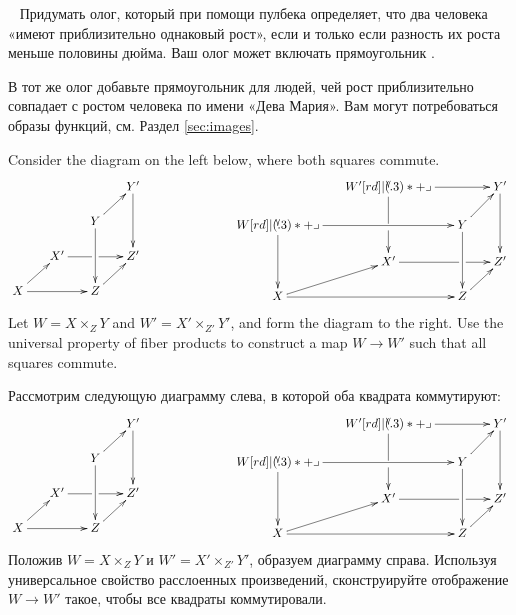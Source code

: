 \begin{exerciseRUS}~
\sexc Придумать олог, который при помощи пулбека определяет, что два человека «имеют приблизительно однаковый рост», если и только если разность их роста меньше половины дюйма. Ваш олог может включать прямоугольник . 
\item В тот же олог добавьте прямоугольник для людей, чей рост приблизительно совпадает с ростом человека по имени «Дева Мария». Вам могут потребоваться образы функций, см. Раздел \ref{sec:images}.
\endsexc
\end{exerciseRUS}

\begin{exerciseENG}\label{exc:pointwise map of fp}
Consider the diagram on the left below, where both squares commute. 
$$
\xymatrix@=15pt{
&&&Y'\ar[dd]\\
&&Y\ar[ru]\ar[dd]\\
&X'\ar'[r][rr]&&Z'\\
X\ar[rr]\ar[ru]&&Z\ar[ru]
}
\hspace{1in}
\xymatrix@=15pt{
&W'\ar[rr]\ar'[d][dd]\ullimit&&Y'\ar[dd]\\
W\ar[rr]\ar[dd]\ullimit&&Y\ar[ru]\ar[dd]\\
&X'\ar'[r][rr]&&Z'\\
X\ar[rr]\ar[ru]&&Z\ar[ru]
}
$$
Let $W=X\times_ZY$ and $W'=X'\times_{Z'}Y'$, and form the diagram to the right. Use the universal property of fiber products to construct a map $W\to W'$ such that all squares commute.
\end{exerciseENG}

\begin{exerciseRUS}[*]\label{exc:pointwise map of fp}
Рассмотрим следующую диаграмму слева, в которой оба квадрата коммутируют: 
$$
\xymatrix@=15pt{
&&&Y'\ar[dd]\\
&&Y\ar[ru]\ar[dd]\\
&X'\ar'[r][rr]&&Z'\\
X\ar[rr]\ar[ru]&&Z\ar[ru]
}
\hspace{1in}
\xymatrix@=15pt{
&W'\ar[rr]\ar'[d][dd]\ullimit&&Y'\ar[dd]\\
W\ar[rr]\ar[dd]\ullimit&&Y\ar[ru]\ar[dd]\\
&X'\ar'[r][rr]&&Z'\\
X\ar[rr]\ar[ru]&&Z\ar[ru]
}
$$
Положив $W=X\times_ZY$ и $W'=X'\times_{Z'}Y'$, образуем диаграмму справа. Используя универсальное свойство расслоенных произведений, сконструируйте отображение $W\to W'$ такое, чтобы все квадраты коммутировали.
\end{exerciseRUS}

